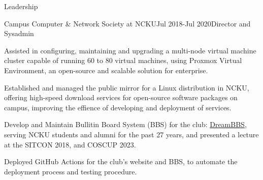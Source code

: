 \documentclass{resume} %
\begin{document}
\begin{rSection}{Leadership}


\begin{rSubsection}{Campus Computer \& Network Society at NCKU}{Jul 2018-Jul 2020}{Director and Sysadmin}{}
\item Assisted in configuring, maintaining and upgrading a multi-node virtual machine cluster capable of running 60 to 80 virtual machines, using Proxmox Virtual Environment, an open-source and scalable solution for enterprise.
\item  Established and managed the public mirror for a Linux distribution in NCKU, offering high-speed download services for open-source software packages on campus, improving the effience of developing and deployment of services.
\item Develop and Maintain Bullitin Board System (BBS) for the club: \href{https://term.ccns.cc}{DreamBBS}, serving NCKU students and alumni for the past 27 years, and presented a lecture at the SITCON 2018, and COSCUP 2023.
\item Deployed GitHub Actions for the club's website and BBS, to automate the deployment process and testing procedure.
\end{rSubsection}


\end{rSection}


\pagebreak
\end{document}
